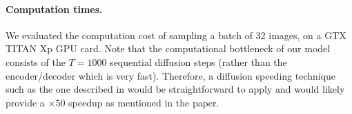\documentclass[nohyperref]{article}
\theoremstyle{plain}
\theoremstyle{definition}
\theoremstyle{remark}
\begin{document}
\paragraph{Computation times. }
We evaluated the computation cost of sampling a batch of 32 images, on a GTX TITAN Xp GPU card. Note that the computational bottleneck of our model consists of the $T=1000$ sequential diffusion steps (rather than the encoder/decoder which is very fast). Therefore, a diffusion speeding technique such as the one described in \cite{song2021denoising} would be straightforward to apply and would likely provide a $\times 50$ speedup as mentioned in the paper. 

\begin{table}
    \caption{Results on \textit{mini}ImageNet. Metrics are computed on the validation dataset. The means are displayed along with the standard deviation in parenthesis.}
    \label{tab:miniimagenet}
\end{table}

\begin{table}
    \caption{Results on CIFAR10. Metrics are computed on the validation dataset. The means are displayed along with the standard deviation in parenthesis.}
    \label{tab:cifar}
\end{table}
\end{document}
